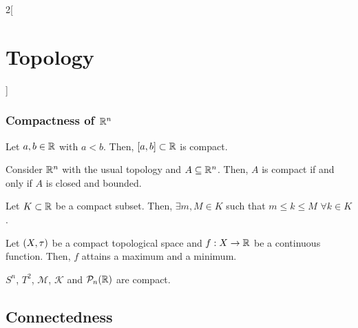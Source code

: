 \documentclass[../../../main.tex]{subfiles}
\begin{document}
\begin{multicols}{2}[\section{Topology}]
  \subsubsection{Compactness of \texorpdfstring{$\mathbb{R}^n$}{Rn}}
  \begin{theorem}
    Let $a,b\in\mathbb{R}$ with $a<b$. Then, $[a,b]\subset\mathbb{R}$ is compact.
  \end{theorem}
  \begin{theorem}
    Consider $\mathbb{R}^n$ with the usual topology and $A\subseteq \mathbb{R}^n$. Then, $A$ is compact if and only if $A$ is closed and bounded.
  \end{theorem}
  \begin{lemma}
    Let $K\subset\mathbb{R}$ be a compact subset. Then, $\exists m,M\in K$ such that $m\leq k\leq M$ $\forall k\in K$.
  \end{lemma}
  \begin{theorem}
    Let $(X,\tau)$ be a compact topological space and $f:X\rightarrow\mathbb{R}$ be a continuous function. Then, $f$ attains a maximum and a minimum.
  \end{theorem}
  \begin{proposition}
    $S^n$, $T^2$, $\mathcal{M}$, $\mathcal{K}$ and $\mathcal{P}_n(\mathbb{R})$ are compact.
  \end{proposition}
  \subsection{Connectedness}

\end{multicols}
\end{document}
